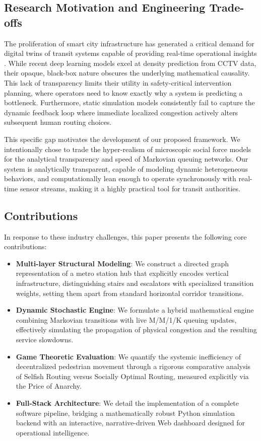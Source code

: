 \documentclass[conference]{IEEEtran}
\begin{document}
\subsection{Research Motivation and Engineering Trade-offs}
The proliferation of smart city infrastructure has generated a critical demand for digital twins of transit systems capable of providing real-time operational insights \cite{b10}. While recent deep learning models excel at density prediction from CCTV data, their opaque, black-box nature obscures the underlying mathematical causality. This lack of transparency limits their utility in safety-critical intervention planning, where operators need to know exactly why a system is predicting a bottleneck. Furthermore, static simulation models consistently fail to capture the dynamic feedback loop where immediate localized congestion actively alters subsequent human routing choices. 

This specific gap motivates the development of our proposed framework. We intentionally chose to trade the hyper-realism of microscopic social force models for the analytical transparency and speed of Markovian queuing networks. Our system is analytically transparent, capable of modeling dynamic heterogeneous behaviors, and computationally lean enough to operate synchronously with real-time sensor streams, making it a highly practical tool for transit authorities.

\subsection{Contributions}
In response to these industry challenges, this paper presents the following core contributions:
\begin{itemize}
    \item \textbf{Multi-layer Structural Modeling}: We construct a directed graph representation of a metro station hub that explicitly encodes vertical infrastructure, distinguishing stairs and escalators with specialized transition weights, setting them apart from standard horizontal corridor transitions.
    \item \textbf{Dynamic Stochastic Engine}: We formulate a hybrid mathematical engine combining Markovian transitions with live M/M/1/K queuing updates, effectively simulating the propagation of physical congestion and the resulting service slowdowns.
    \item \textbf{Game Theoretic Evaluation}: We quantify the systemic inefficiency of decentralized pedestrian movement through a rigorous comparative analysis of Selfish Routing versus Socially Optimal Routing, measured explicitly via the Price of Anarchy.
    \item \textbf{Full-Stack Architecture}: We detail the implementation of a complete software pipeline, bridging a mathematically robust Python simulation backend with an interactive, narrative-driven Web dashboard designed for operational intelligence.
\end{itemize}
\end{document}
